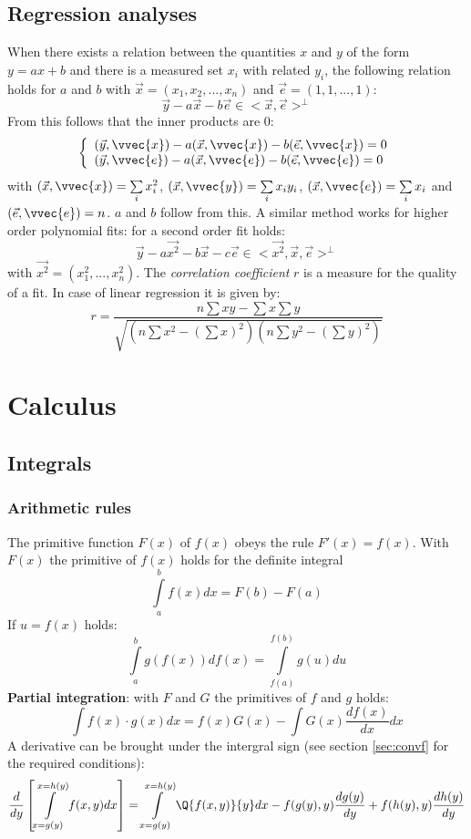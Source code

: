 \section{Regression analyses}
When there exists a relation between the quantities $x$ and $y$ of the form
$y=ax+b$ and there is a measured set $x_i$ with related $y_i$, the following
relation holds for $a$ and $b$ with $\vec{x}=(x_1,x_2,...,x_n)$ and
$\vec{e}=(1,1,...,1)$:
\[
\vec{y}-a\vec{x}-b\vec{e}\in<\vec{x},\vec{e}>^\perp
\]
From this follows that the inner products are 0:
\[
\left\{
\begin{array}{l}
(\vec{y},\vvec{x})-a(\vec{x},\vvec{x})-b(\vec{e},\vvec{x})=0\\
(\vec{y},\vvec{e})-a(\vec{x},\vvec{e})-b(\vec{e},\vvec{e})=0
\end{array}\right.
\]
with $(\vec{x},\vvec{x})=\sum\limits_i x_i^2$, $(\vec{x},\vvec{y})=\sum\limits_ix_iy_i$,
$(\vec{x},\vvec{e})=\sum\limits_ix_i$ and $(\vec{e},\vvec{e})=n$.
$a$ and $b$ follow from this.
\npar
A similar method works for higher order polynomial fits: for a second order
fit holds:
\[
\vec{y}-a\vec{x^2}-b\vec{x}-c\vec{e}\in<\vec{x^2},\vec{x},\vec{e}>^\perp
\]
with $\vec{x^2}=(x_1^2,...,x_n^2)$.
\npar
The {\it correlation coefficient} $r$ is a measure for the quality of a fit.
In case of linear regression it is given by:
\[
r=\frac{n\sum xy-\sum x\sum y}{\sqrt{(n\sum x^2-(\sum x)^2)(n\sum y^2-(\sum y)^2)}}
\]


\chapter{Calculus}
\section{Integrals}
\subsection{Arithmetic rules}
The primitive function $F(x)$ of $f(x)$ obeys the rule $F'(x)=f(x)$. With
$F(x)$ the primitive of $f(x)$ holds for the definite integral
\[
\int\limits_a^bf(x)dx=F(b)-F(a)
\]
If $u=f(x)$ holds:
\[
\int\limits_a^bg(f(x))df(x)=\int\limits_{f(a)}^{f(b)}g(u)du
\]
{\bf Partial integration}: with $F$ and $G$ the primitives of $f$ and $g$
holds:
\[
\int f(x)\cdot g(x)dx=f(x)G(x)-\int G(x)\frac{df(x)}{dx}dx
\]
A derivative can be brought under the intergral sign (see section
\ref{sec:convf} for the required conditions):
\[
\frac{d}{dy}\left[\int\limits_{x=g(y)}^{x=h(y)}f(x,y)dx\right]=
\int\limits_{x=g(y)}^{x=h(y)}\Q{f(x,y)}{y}dx-f(g(y),y)\frac{dg(y)}{dy}+f(h(y),y)\frac{dh(y)}{dy}
\]


